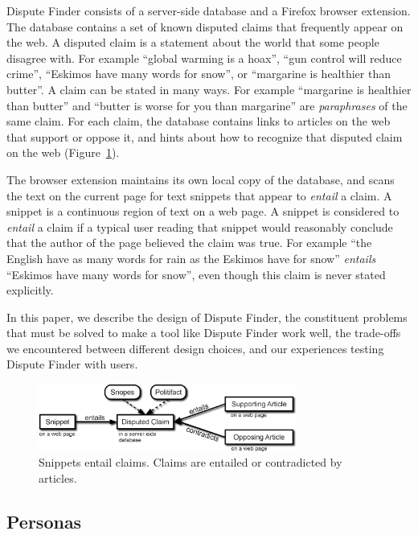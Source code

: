\documentclass{www2010-submission}
\newcommand{\todo}[1]{}
\begin{document}
Dispute Finder consists of a server-side database and a Firefox browser extension. The database contains a set of known disputed claims that frequently appear on the web. A disputed claim is a statement about the world that some people disagree with. For example ``global warming is a hoax'', ``gun control will reduce crime'', ``Eskimos have many words for snow'', or ``margarine is healthier than butter''. A claim can be stated in many ways. For example ``margarine is healthier than butter'' and ``butter is worse for you than margarine'' are {\it paraphrases} of the same claim. For each claim, the database contains links to articles on the web that support or oppose it, and hints about how to recognize that disputed claim on the web (Figure~\ref{snippet_claim_article}).

The browser extension maintains its own local copy of the database, and scans the text on the current page for text snippets that appear to {\it entail} a claim. A snippet is a continuous region of text on a web page. A snippet is considered to {\it entail} a claim if a typical user reading that snippet would reasonably conclude that the author of the page believed the claim was true. For example ``the English have as many words for rain as the Eskimos have for snow'' {\it entails} ``Eskimos have many words for snow'', even though this claim is never stated explicitly.

\todo{Should we mention the API? Cut from this version as tangential}

In this paper, we describe the design of Dispute Finder, the constituent problems that must be solved to make a tool like Dispute Finder work well, the trade-offs we encountered between different design choices, and our experiences testing Dispute Finder with users.

\begin{figure}[tb]
	\begin{center}
	\includegraphics[width=8.5cm]{pictures/snippet_claim_article_fancy3.png}
	\caption{Snippets entail claims. Claims are entailed or contradicted by articles.}
	\label{snippet_claim_article}
	\end{center}
\end{figure}


\subsection{Personas}
\end{document}
